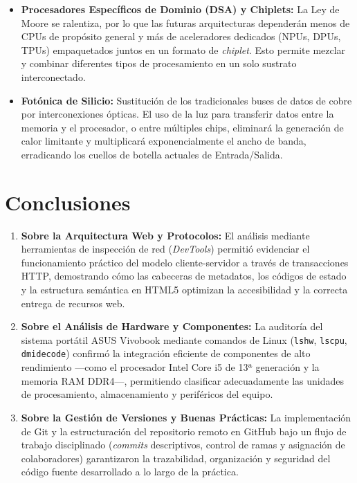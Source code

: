 \documentclass[10pt]{article}
\begin{document}
\begin{enumerate}
\begin{itemize}
        \item \textbf{Procesadores Específicos de Dominio (DSA) y Chiplets:} La Ley de Moore se ralentiza, por lo que las futuras arquitecturas dependerán menos de CPUs de propósito general y más de aceleradores dedicados (NPUs, DPUs, TPUs) empaquetados juntos en un formato de \textit{chiplet}. Esto permite mezclar y combinar diferentes tipos de procesamiento en un solo sustrato interconectado.

        \item \textbf{Fotónica de Silicio:} Sustitución de los tradicionales buses de datos de cobre por interconexiones ópticas. El uso de la luz para transferir datos entre la memoria y el procesador, o entre múltiples chips, eliminará la generación de calor limitante y multiplicará exponencialmente el ancho de banda, erradicando los cuellos de botella actuales de Entrada/Salida.
    \end{itemize}

\end{enumerate}

\section{Conclusiones}
\begin{enumerate}
    \item \textbf{Sobre la Arquitectura Web y Protocolos:} El análisis mediante herramientas de inspección de red (\textit{DevTools}) permitió evidenciar el funcionamiento práctico del modelo cliente-servidor a través de transacciones HTTP, demostrando cómo las cabeceras de metadatos, los códigos de estado y la estructura semántica en HTML5 optimizan la accesibilidad y la correcta entrega de recursos web.
    
    \item \textbf{Sobre el Análisis de Hardware y Componentes:} La auditoría del sistema portátil ASUS Vivobook mediante comandos de Linux (\texttt{lshw}, \texttt{lscpu}, \texttt{dmidecode}) confirmó la integración eficiente de componentes de alto rendimiento —como el procesador Intel Core i5 de 13ª generación y la memoria RAM DDR4—, permitiendo clasificar adecuadamente las unidades de procesamiento, almacenamiento y periféricos del equipo.
    
    \item \textbf{Sobre la Gestión de Versiones y Buenas Prácticas:} La implementación de Git y la estructuración del repositorio remoto en GitHub bajo un flujo de trabajo disciplinado (\textit{commits} descriptivos, control de ramas y asignación de colaboradores) garantizaron la trazabilidad, organización y seguridad del código fuente desarrollado a lo largo de la práctica.
\end{enumerate}
\end{document}
